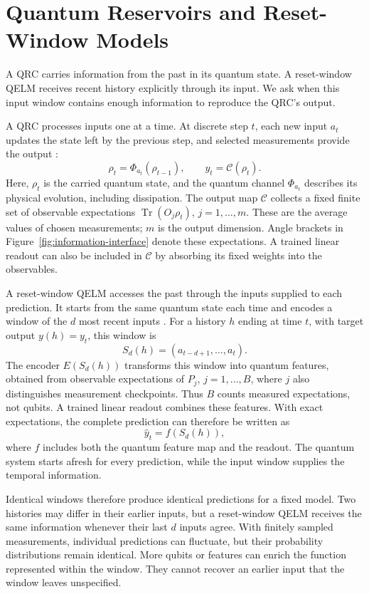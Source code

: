 \section{Quantum Reservoirs and Reset-Window Models}
\label{sec:models}

A QRC carries information from the past in its quantum state.
A reset-window QELM receives recent history explicitly through its input.
We ask when this input window contains enough information to reproduce
the QRC's output.

A QRC processes inputs one at a time. At discrete step $t$, each new input
$a_t$ updates the state left by the previous step, and selected measurements
provide the output \cite{fujii2017harnessing,mujal2021opportunities}:
\[
 \rho_t=\Phi_{a_t}(\rho_{t-1}),
 \qquad y_t=\mathcal C(\rho_t).
\]
Here, $\rho_t$ is the carried quantum state, and the quantum channel
$\Phi_{a_t}$ describes its physical evolution, including dissipation.
The output map $\mathcal C$ collects a fixed finite set of observable
expectations $\operatorname{Tr}(O_j\rho_t)$, $j=1,\ldots,m$.
These are the average values of chosen measurements; $m$ is the output
dimension. Angle brackets in Figure~\ref{fig:information-interface} denote
these expectations. A trained linear readout can also be included in
$\mathcal C$ by absorbing its fixed weights into the observables.

A reset-window QELM accesses the past through the inputs supplied to each
prediction. It starts from the same quantum state each time and encodes a
window of the $d$ most recent inputs
\cite{innocenti2023potential,kawanabe2026tdqelm}.
For a history $h$ ending at time $t$, with target output $y(h)=y_t$,
this window is
\[
 S_d(h)=(a_{t-d+1},\ldots,a_t).
\]
The encoder $E(S_d(h))$ transforms this window into quantum features,
obtained from observable expectations of $P_j$, $j=1,\ldots,B$,
where $j$ also distinguishes measurement checkpoints.
Thus $B$ counts measured expectations, not qubits.
A trained linear readout combines these features. With exact expectations,
the complete prediction can therefore be written as
\[
 \widehat y_t=f(S_d(h)),
\]
where $f$ includes both the quantum feature map and the readout.
The quantum system starts afresh for every prediction, while the input
window supplies the temporal information.

Identical windows therefore produce identical predictions for a
fixed model. Two histories may differ in their earlier inputs, but a
reset-window QELM receives the same information whenever their last $d$
inputs agree. With finitely sampled measurements, individual predictions
can fluctuate, but their probability distributions remain identical.
More qubits or features can enrich the function represented within the
window. They cannot recover an earlier input that the window leaves
unspecified.

